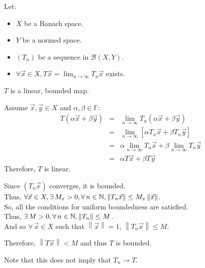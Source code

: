 \documentclass[letterpaper,12pt,fleqn]{article}
\newcommand{\B}{\mathcal{B}}
\newcommand{\norm}[1]{\left\|#1\right\|}
\newcommand{\vx}{\vec{x}}
\newcommand{\vy}{\vec{y}}
\renewcommand{\a}{\alpha}
\renewcommand{\b}{\beta}
\newcommand{\F}{\mathbb{F}}
\begin{document}
\begin{corollary}
  Let:
  \begin{itemize}
  \item $X$ be a Banach space.
  \item $Y$ be a normed space.
  \item $(T_n)$ be a sequence in $\B(X,Y)$.
  \item $\forall\vx\in X,T\vx=\lim_{n\to\infty}T_n\vx$ exists.
  \end{itemize}
  $T$ is a linear, bounded map.
\end{corollary}

\begin{theproof}
  Assume $\vx,\vy\in X$ and $\a,\b\in\F$:
  \begin{eqnarray*}
    T(\a\vx+\b\vy) &=& \lim_{n\to\infty}T_n(\a\vx+\b\vy) \\
    &=& \lim_{n\to\infty}[\a T_n\vx+\b T_n\vy] \\
    &=& \a\lim_{n\to\infty}T_n\vx+\b\lim_{n\to\infty}T_n\vy \\
    &=& \a T\vx+\b T\vy
  \end{eqnarray*}
  Therefore, $T$ is linear.

  Since $(T_n\vx)$ converges, it is bounded. \\
  Thus, $\forall\vx\in X, \exists\,M_x>0,\forall\,n\in\N,\norm{T_n\vx}\le
  M_x\norm{\vx}$. \\
  So, all the conditions for uniform boundedness are satisfied. \\
  Thus, $\exists\,M>0,\forall\,n\in\N,\norm{T_n}\le M$. \\
  And so $\forall\,\vx\in X$ such that $\norm{\vx}=1$, $\norm{T_n\vx}\le M$.

  Therefore, $\norm{T\vx}<M$ and thus $T$ is bounded.
\end{theproof}

Note that this does not imply that $T_n\to T$.
\end{document}
